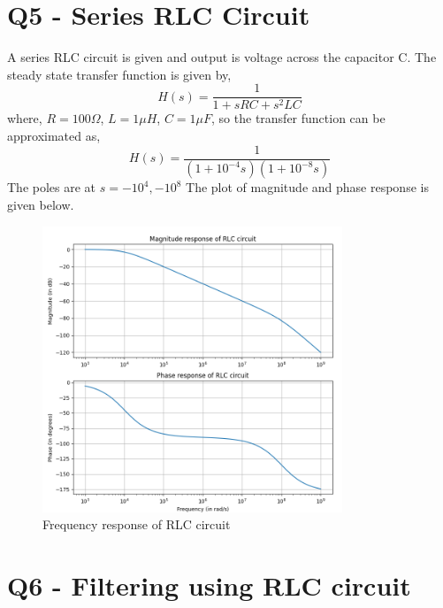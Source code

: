 \documentclass[12pt, a4paper]{article}
\begin{document}
\section{Q5 - Series RLC Circuit}

A series RLC circuit is given and output is voltage across the capacitor C. The steady state transfer function is given by,
\begin{equation*}
H(s) = \frac{1}{1 + sRC + s^2LC}
\end{equation*}
where, $R = 100\Omega$, $L = 1\mu H$, $C = 1\mu F$, so the transfer function can be approximated as,
\begin{equation*}
H(s) = \frac{1}{(1+10^{-4}s)(1+10^{-8}s)}
\end{equation*}
The poles are at $s = -10^4, -10^8$
The plot of magnitude and phase response is given below.
\begin{figure}[H]
\centering
\includegraphics[width=0.8\textwidth]{Figure_9.png}
\caption{Frequency response of RLC circuit}
\end{figure}

\section{Q6 - Filtering using RLC circuit}
\end{document}

